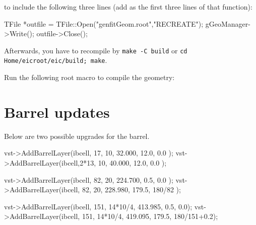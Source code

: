 \documentclass[12pt]{article}
\begin{document}
to include the following three lines (add as the first three lines of that function):

\begin{tcolorbox}
\begin{verbnobox}[\scriptsize]
TFile *outfile = TFile::Open("genfitGeom.root","RECREATE");
gGeoManager->Write();
outfile->Close();
\end{verbnobox}  
\end{tcolorbox}

Afterwards, you have to recompile by \verb|make -C build| or \verb|cd Home/eicroot/eic/build; make|.

Run the following root macro to compile the geometry:

\begin{tcolorbox}
\end{tcolorbox}

\section{Barrel updates}

Below are two possible upgrades for the barrel.

\begin{tcolorbox}
\begin{verbnobox}[\scriptsize]
vst->AddBarrelLayer(ibcell,  17,      10,  32.000,  12.0, 0.0        );
vst->AddBarrelLayer(ibcell,2*13,      10,  40.000,  12.0, 0.0        );

vst->AddBarrelLayer(ibcell,  82,      20, 224.700,   0.5, 0.0        );
vst->AddBarrelLayer(ibcell,  82,      20, 228.980, 179.5, 180/82     );

vst->AddBarrelLayer(ibcell, 151, 14*10/4, 413.985,   0.5,         0.0);
vst->AddBarrelLayer(ibcell, 151, 14*10/4, 419.095, 179.5, 180/151+0.2);
\end{verbnobox}  
\end{tcolorbox}
\end{document}
